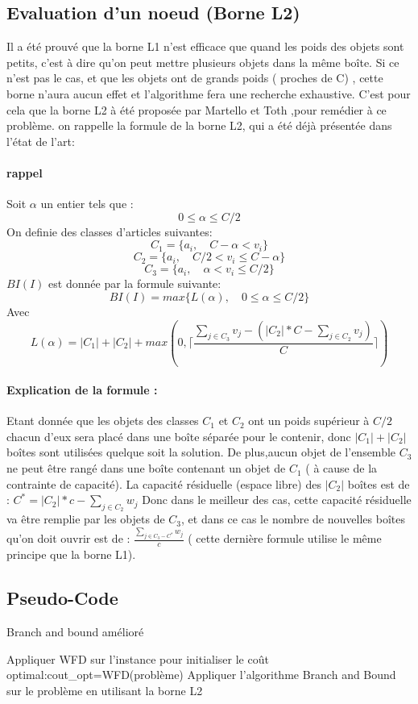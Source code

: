 \documentclass[12pt]{article}
\begin{document}
\subsection*{Evaluation d'un noeud (Borne L2)}
Il a été prouvé que la borne L1 n’est efficace que quand les poids des objets sont petits, c’est à dire qu’on peut mettre plusieurs objets dans la même boîte. Si ce n’est pas le cas, et que les objets ont de grands poids ( proches de C) , cette borne n’aura aucun effet et l’algorithme fera une recherche exhaustive. 
C’est pour cela que la borne L2 à été proposée par Martello et Toth ,pour remédier à ce problème. 
on rappelle la formule de la borne L2, qui a été déjà présentée dans l’état de l’art:
\paragraph{rappel}
Soit \(\alpha\) un entier tels que :
\[0 \le \alpha \le C/2\]
On definie des classes d'articles suivantes: 
\[C_1 = \{a_i, \quad C-\alpha < v_i\} \]
\[C_2 = \{a_i, \quad C/2 < v_i \le C-\alpha\} \]
\[C_3 = \{a_i, \quad \alpha < v_i \le C/2\} \]
\(BI(I)\)  est donnée par la formule suivante:
\[BI(I)=max\{L(\alpha),\quad 0 \le \alpha \le C/2\}\]
Avec
\[L(\alpha)=|C_1|+|C_2|+max(0, \lceil{\frac{\sum_{j \in C_3}^{} v_j - (|C_2|*C - \sum_{j \in C_2}^{} v_j) }{C}}\rceil)\]
\paragraph{Explication de la formule :}
Etant donnée que les objets des classes $C_1$ et $C_2$ ont un poids supérieur à $C/2$ chacun d'eux sera placé dans une boîte séparée pour le contenir, donc
$|C_1|+|C_2|$boîtes sont utilisées quelque soit la solution. De plus,aucun objet de l’ensemble $C_3$ ne peut être rangé dans une boîte contenant un objet de $C_1$ ( à cause de la contrainte de capacité). La capacité résiduelle (espace libre) des
$|C_2|$ boîtes est de : $C^*=|C_2|*c-\sum_{j \in C_2}^{} w_j$
Donc dans le meilleur des cas, cette capacité résiduelle va être remplie par les objets de $C_3$, et dans ce cas le nombre de nouvelles boîtes qu’on doit ouvrir est de :  
$\frac{\sum_{j \in C_3 -C^*}^{} w_j}{c}$ ( cette dernière formule utilise le même principe que la borne L1).
\subsection{Pseudo-Code}
\begin{algorithm}[H]
   \caption{Branch and bound amélioré }
   \begin{algorithmic} 
   \STATE Appliquer WFD sur l’instance pour initialiser le coût optimal:\linebreak cout\_opt=WFD(problème)
   \STATE Appliquer l’algorithme Branch and Bound sur le problème en utilisant la borne L2
   \end{algorithmic} 
\end{algorithm}
\end{document}
